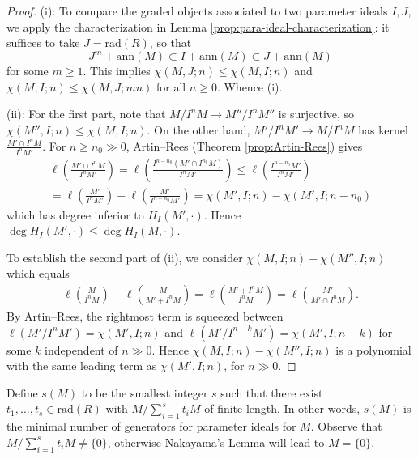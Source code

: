 \begin{proof}
	(i): To compare the graded objects associated to two parameter ideals $I, J$, we apply the characterization in Lemma \ref{prop:para-ideal-characterization}: it suffices to take $J = \text{rad}(R)$, so that
	\[ J^m + \text{ann}(M) \subset I + \text{ann}(M) \subset J + \text{ann}(M) \]
	for some $m \geq 1$. This implies $\chi(M,J; n) \leq \chi(M,I;n)$ and $\chi(M,I;n) \leq \chi(M,J;mn)$ for all $n \geq 0$. Whence (i).

	(ii): For the first part, note that $M/I^n M \to M''/I^n M''$ is surjective, so $\chi(M'', I; n) \leq \chi(M, I; n)$. On the other hand, $M'/I^n M' \to M/I^n M$ has kernel $\frac{M' \cap I^n M}{I^n M'}$. For $n \geq n_0 \gg 0$, Artin--Rees (Theorem \ref{prop:Artin-Rees}) gives
	\begin{multline*}
		\ell\left(\frac{M' \cap I^n M}{I^n M'}\right) = \ell\left(\frac{I^{n - n_0}(M' \cap I^{n_0} M)}{I^n M'}\right) \leq \ell\left(\frac{I^{n - n_0} M'}{I^n M'}\right) \\
		= \ell\left( \frac{M'}{I^n M'} \right) - \ell\left( \frac{M'}{I^{n - n_0} M'}\right) = \chi(M', I; n) - \chi(M', I; n-n_0)
	\end{multline*}
	which has degree inferior to $H_I(M', \cdot)$. Hence $\deg H_I(M', \cdot) \leq \deg H_I(M, \cdot)$.

	To establish the second part of (ii), we consider $\chi(M, I; n) - \chi(M'', I; n)$ which equals
	\begin{gather*}
		\ell\left(\frac{M}{I^n M}\right) - \ell\left( \frac{M}{M' + I^n M} \right) = \ell\left( \frac{M' + I^n M}{I^n M} \right) = \ell\left( \frac{M'}{M' \cap I^n M} \right).
	\end{gather*}
	By Artin--Rees, the rightmost term is squeezed between $\ell(M'/I^n M') = \chi(M',I; n)$ and $\ell( M'/I^{n-k} M') = \chi(M', I; n-k)$ for some $k$ independent of $n \gg 0$. Hence $\chi(M, I; n) - \chi(M'', I; n)$ is a polynomial with the same leading term as $\chi(M', I; n)$, for $n \gg 0$.
\end{proof}

Define $s(M)$ to be the smallest integer $s$ such that there exist $t_1, \ldots, t_s \in \text{rad}(R)$ with $M/\sum_{i=1}^s t_i M$ of finite length. In other words, $s(M)$ is the minimal number of generators for parameter ideals for $M$. Observe that $M/\sum_{i=1}^s t_i M \neq \{0\}$, otherwise Nakayama's Lemma will lead to $M = \{0\}$.

